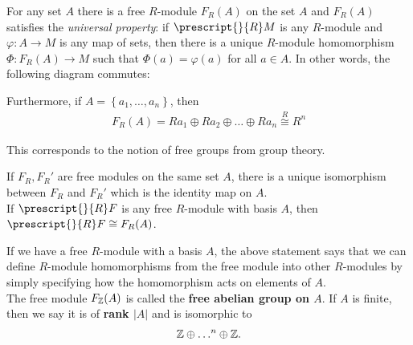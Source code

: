 \documentclass{memoir}
\begin{document}
\begin{thm}
	For any set \(A\) there is a free \(R\)-module \(F_R(A)\) on the set \(A\) and \(F_R(A)\) satisfies the \textit{universal property}: if \(\prescript{}{R}M\) is any \(R\)-module and \(\varphi :A\to M\) is any map of sets, then there is a unique \(R\)-module homomorphism \(\Phi:F_R(A) \to M\) such that \(\Phi (a) = \varphi (a)\) for all \(a \in A\). In other words, the following diagram commutes:
\begin{center}
\end{center}
Furthermore, if \(A = \left\{ a_1,\ldots,a_n \right\} \), then
\begin{align*}
	F_R(A) = Ra_1 \oplus Ra_2 \oplus \ldots \oplus Ra_n \stackrel{R}{\cong} R^{n}
\end{align*}
\end{thm}
This corresponds to the notion of free groups from group theory.

\begin{hw}
	If \(F_R,F_R'\) are free modules on the same set \(A\), there is a unique isomorphism between \(F_R\) and \(F_R'\) which is the identity map on \(A\).\\

	If \(\prescript{}{R}F\) is any free \(R\)-module with basis \(A\), then \(\prescript{}{R}F \cong F_R(A)\).
\end{hw}
If we have a free \(R\)-module with a basis \(A\), the above statement says that we can define \(R\)-module homomorphisms from the free module into other \(R\)-modules by simply specifying how the homomorphism acts on elements of \(A\).\\

The free module \(F_{\mathbb{Z}}(A)\) is called the \textbf{free abelian group on \(A\)}. If \(A\) is finite, then we say it is of \textbf{rank \(\left| A \right| \)} and is isomorphic to
\begin{align*}
	\mathbb{Z} \oplus \ldots^{n} \oplus \mathbb{Z}.
\end{align*}

%
%
\end{document}

